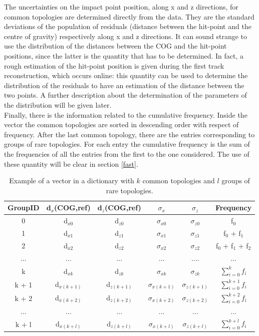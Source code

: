 The uncertainties on the impact point position, along x and z directions, for common topologies are determined directly from the data. They are the standard deviations of the population of residuals (distance between the hit-point and the centre of gravity) respectively along x and z directions. It can sound strange to use the distribution of the distances between the COG and the hit-point positions, since the latter is the quantity that has to be determined. In fact, a rough estimation of the hit-point position is given during the first track reconstruction, which occurs online: this quantity can be used to determine the distribution of the residuals to have an estimation of the distance between the two points. A further description about the determination of the parameters of the distribution will be given later.\\
Finally, there is the information related to the cumulative frequency. Inside the vector the common topologies are sorted in descending order with respect of frequency. After the last common topology, there are the entries corresponding to groups of rare topologies. For each entry the cumulative frequency is the sum of the frequencies of all the entries from the first to the one considered. The use of these quantity will be clear in section \ref{fast}.
%
\begin{table}
\centering
\renewcommand\arraystretch{1.5}
 \begin{tabular}{|c|c|c|c|c|c|}
  \hline
  GroupID & d$_x$(COG,ref) & d$_z$(COG,ref) & $\sigma_x$ & $\sigma_z$ & Frequency\\
  \hline
  0 & d$_{x0}$ & d$_{z0}$ & $\sigma_{x0}$ & $\sigma_{z0}$ & f$_0$\\
  1 & d$_{x1}$ & d$_{z1}$ & $\sigma_{x1}$ & $\sigma_{z1}$ & f$_0$ + f$_1$\\
  2 & d$_{x2}$ & d$_{z2}$ & $\sigma_{x2}$ & $\sigma_{z2}$ & f$_0$ + f$_1$ + f$_2$\\
  ... & ... & ... & ... & .... & ... \\
  k & d$_{xk}$ & d$_{zk}$ & $\sigma_{xk}$ & $\sigma_{zk}$ & $\sum_{i=0}^{k} f_i$ \\
  k + 1 & d$_{x(k+1)}$ & d$_{z(k+1)}$ & $\sigma_{x(k+1)}$ & $\sigma_{z(k+1)}$ & $\sum_{i=0}^{k+1} f_i$\\
  k + 2 & d$_{x(k+2)}$ & d$_{z(k+2)}$ & $\sigma_{x(k+2)}$ & $\sigma_{z(k+2)}$ & $\sum_{i=0}^{k+2} f_i$\\
  ... & ... & ... & ... & ... & ...\\
  k + l & d$_{x(k+l)}$ & d$_{z(k+l)}$ & $\sigma_{x(k+l)}$ & $\sigma_{z(k+l)}$ & $\sum_{i=0}^{k+l} f_i$\\
  \hline
 \end{tabular}
 \caption{Example of a vector in a dictionary with $k$ common topologies and $l$ groups of rare topologies.}
 \label{tab:vec}
\end{table}
%
